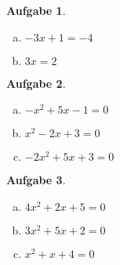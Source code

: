 \documentclass[12pt]{article}
\theoremstyle{note}
\newtheorem{aufgabe}{Aufgabe}
\begin{document}
\begin{flushleft}
\begin{aufgabe}
\begin{multicols}{3}
\begin{enumerate}[a)]
\item $- 3 x + 1 = -4$\\

\item $3 x = 2$\\

\end{enumerate} 
\end{multicols} 
\end{aufgabe}\vspace{1em}\begin{aufgabe} ~ \ 
\begin{multicols}{3} 
\begin{enumerate}[a)] 
\item $- x^{2} + 5 x - 1 = 0$\\
\item $x^{2} - 2 x + 3 = 0$\\
\item $- 2 x^{2} + 5 x + 3 = 0$\\
\end{enumerate} 
\end{multicols} 
\end{aufgabe}\vspace{1em}\begin{aufgabe} ~ \ 
\begin{multicols}{3} 
\begin{enumerate}[a)] 
\item $4 x^{2} + 2 x + 5 = 0$\\
\item $3 x^{2} + 5 x + 2 = 0$\\
\item $x^{2} + x + 4 = 0$\\
\end{enumerate} 
\end{multicols} 
\end{aufgabe}\vspace{1em}
\end{flushleft} 
\end{document}
